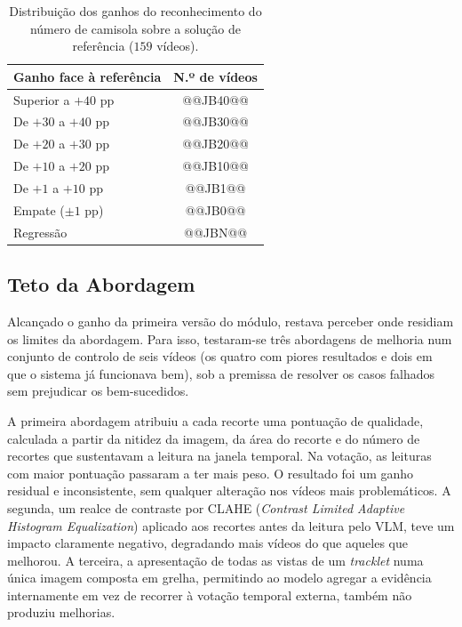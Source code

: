 \begin{table}[htbp]
    \centering
    \caption{Distribuição dos ganhos do reconhecimento do número de camisola sobre a solução de
    referência ($159$ vídeos).}
    \label{tab:jnr-distribuicao}
    \begin{tabular}{|l|c|}
        \hline
        \textbf{Ganho face à referência} & \textbf{N.º de vídeos} \\
        \hline
        Superior a $+40$ pp & @@JB40@@ \\
        \hline
        De $+30$ a $+40$ pp & @@JB30@@ \\
        \hline
        De $+20$ a $+30$ pp & @@JB20@@ \\
        \hline
        De $+10$ a $+20$ pp & @@JB10@@ \\
        \hline
        De $+1$ a $+10$ pp  & @@JB1@@ \\
        \hline
        Empate ($\pm 1$ pp) & @@JB0@@ \\
        \hline
        Regressão           & @@JBN@@ \\
        \hline
    \end{tabular}
\end{table}


\subsection{Teto da Abordagem}\label{sec:res_jnr_teto}

Alcançado o ganho da primeira versão do módulo, restava perceber onde residiam os limites da
abordagem. Para isso, testaram-se
três abordagens de melhoria num conjunto de controlo de seis vídeos (os quatro com piores resultados
e dois em que o sistema já funcionava bem), sob a premissa de resolver os casos falhados sem
prejudicar os bem-sucedidos.

A primeira abordagem atribuiu a cada recorte uma pontuação de qualidade, calculada a partir da nitidez
da imagem, da área do recorte e do número de recortes que sustentavam a leitura na janela temporal.
Na votação, as leituras com maior pontuação passaram a ter mais peso. O resultado foi um ganho
residual e inconsistente, sem qualquer alteração nos vídeos mais problemáticos. A segunda, um realce
de contraste por CLAHE (\emph{Contrast Limited Adaptive Histogram Equalization}) aplicado aos
recortes antes da leitura pelo VLM, teve um impacto claramente negativo, degradando mais vídeos do
que aqueles que melhorou. A terceira, a apresentação de todas as vistas de um \emph{tracklet} numa
única imagem composta em grelha, permitindo ao modelo agregar a evidência internamente em vez de
recorrer à votação temporal externa, também não produziu melhorias.

